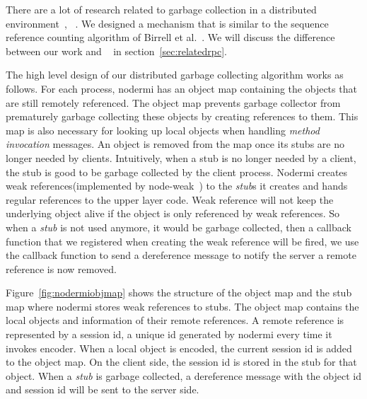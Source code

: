 There are a lot of research related to garbage collection in a distributed
environment~\cite{abdullahi1998garbage}, ~\cite{birrell1993distributed}.
We designed a mechanism that is similar to the sequence reference counting algorithm
of Birrell et al.~\cite{birrell1993distributed}.
We will discuss the difference between our work and ~\cite{birrell1993distributed}
in section~\ref{sec:relatedrpc}.

The high level design of our distributed garbage collecting 
algorithm works as follows.
For each process, nodermi has an object map containing the objects 
that are still remotely referenced.
The object map prevents garbage collector from prematurely garbage collecting
these objects by creating references to them.
This map is also necessary for looking up local objects 
when handling \emph{method invocation} messages.
An object is removed from the map once its stubs
are no longer needed by clients.
Intuitively,
when a stub is no longer needed by a client,
the stub is good to be garbage collected by the client process.
Nodermi creates weak references(implemented by node-weak~\cite{nodeweak}) 
to the \emph{stub}s it creates
and hands regular references to the upper layer code.
Weak reference will not keep the underlying object alive
if the object is only referenced by weak references.
So when a \emph{stub} is not used anymore,
it would be garbage collected,
then a callback function that we registered when creating the weak
reference will be fired,
we use the callback function to send 
a dereference message to notify the server
a remote reference is now removed.


\nodrmiobjmapfig{}

Figure~\ref{fig:nodermiobjmap} shows the structure of
the object map and the stub map where nodermi stores weak references to stubs.
The object map contains the local objects and information of
their remote references.
A remote reference is represented by a session id,
a unique id generated by nodermi every time it invokes encoder.
When a local object is encoded, the current session id is added to 
the object map.
On the client side, the session id is stored in the stub for that object.
When a \emph{stub} is garbage collected,
a dereference message with the object id and session id will 
be sent to the server side.


\nodrmiracefig{}


